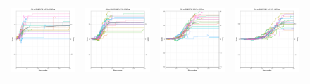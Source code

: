 \begin{figure}
\begin{tabular}{cccc}
\hspace{-0.5cm}\includegraphics[width = 1.55in]{images/Visualizations/GAvsRANDOM/4000ms5x5.png} &
\hspace{-0.5cm}\includegraphics[width = 1.55in]{images/Visualizations/GAvsRANDOM/4000ms7x7.png} &
\hspace{-0.5cm}\includegraphics[width = 1.55in]{images/Visualizations/GAvsRANDOM/4000ms9x9.png} &
\hspace{-0.5cm}\includegraphics[width = 1.55in]{images/Visualizations/GAvsRANDOM/4000ms11x11.png} \\


\end{tabular}
\end{figure}
